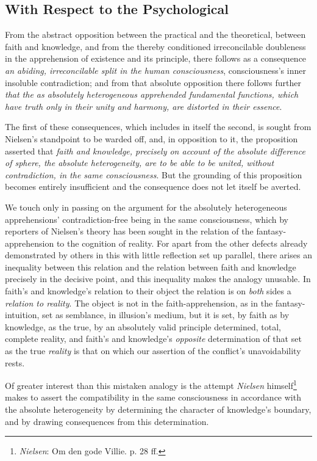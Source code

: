 \documentclass[12pt,a4paper]{book}
\begin{document}
\subsection{With Respect to the Psychological}
\label{ssec:conseq-psych}

From the abstract opposition between the practical and the theoretical, between faith and
knowledge, and from the thereby conditioned irreconcilable doubleness in the apprehension of
existence and its principle, there follows as a consequence \emph{an abiding, irreconcilable
split in the human consciousness}, consciousness's inner insoluble contradiction; and from
that absolute opposition there follows further \emph{that the as absolutely heterogeneous
apprehended fundamental functions, which have truth only in their unity and harmony, are
distorted in their essence}.

The first of these consequences, which includes in itself the second, is sought from Nielsen's
standpoint to be warded off, and, in opposition to it, the proposition asserted that \emph{faith and
knowledge, precisely on account of the absolute difference of sphere, the absolute
heterogeneity, are to be able to be united, without contradiction, in the same consciousness}.
But the grounding of this proposition becomes entirely insufficient and the consequence does
not let itself be averted.

We touch only in passing on the argument for the absolutely heterogeneous apprehensions'
contradiction-free being in the same consciousness, which by reporters of Nielsen's theory has
been sought in the relation of the fantasy-apprehension to the cognition of reality. For apart
from the other defects already demonstrated by others in this with little reflection set up
parallel, there arises an inequality between this relation and the relation between faith and
knowledge precisely in the decisive point, and this inequality makes the analogy unusable. In
faith's and knowledge's relation to their object the relation is on \emph{both} sides a \emph{relation to
reality}. The object is not in the faith-apprehension, as in the fantasy-intuition, set as
semblance, in illusion's medium, but it is set, by faith as by knowledge, as the true, by an
absolutely valid principle determined, total, complete reality, and faith's and knowledge's
\emph{opposite} determination of that set as the true \emph{reality} is that on which our assertion of
the conflict's unavoidability rests.

Of greater interest than this mistaken analogy is the attempt \emph{Nielsen} himself\footnote{\emph{Nielsen}:
Om den gode Villie. p. 28 ff.} makes to assert the compatibility in the same consciousness in
accordance with the absolute heterogeneity by determining the character of knowledge's boundary,
and by drawing consequences from this determination.
\end{document}

